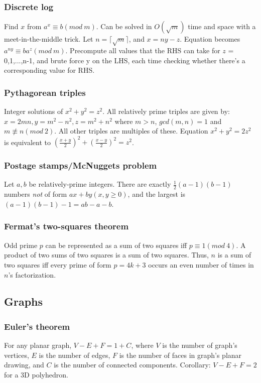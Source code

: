 \documentclass[a4paper,13pt]{article}
\begin{document}
\subsubsection{Discrete log}
Find $x$ from $a^x \equiv b (mod\ m)$. Can be solved in $O(\sqrt{m})$ time and space with a meet-in-the-middle trick. Let $n = \lceil \sqrt{m} \rceil$, and $x = ny - z$. Equation becomes $a^{ny} \equiv ba^z (mod\ m)$.
Precompute all values that the RHS can take for $z$ = 0,1,...,n-1, and brute force y on the LHS, each time checking whether there’s a corresponding value for RHS.

\subsubsection{Pythagorean triples}
Integer solutions of $x^2 + y^2 = z^2$. All relatively prime triples are given by: $x = 2mn, y = m^2 - n^2, z = m^2 + n^2$ where $m > n$, $gcd(m,n) = 1$ and $m \not\equiv n (mod\ 2)$. All other triples
are multiples of these. Equation $x^2 + y^2 = 2z^2$ is equivalent to $(\frac{x+y}{2})^2 + (\frac{x-y}{2})^2 = z^2$.

\subsubsection{Postage stamps/McNuggets problem}
Let $a, b$ be relatively-prime integers. There are exactly $\frac{1}{2}(a-1)(b-1)$ numbers \emph{not} of form $ax + by (x,y \geq 0)$, and the largest is $(a-1)(b-1)-1 = ab-a-b$.

\subsubsection{Fermat's two-squares theorem}
Odd prime $p$ can be represented as a sum of two squares iff $p \equiv 1 (mod\ 4)$. A product of two sums of two squares is a sum of two squares. Thus, $n$ is a sum of two squares iff every prime of form $p = 4k + 3$ occurs an even number of times in $n$'s factorization.

\subsection{Graphs}
\subsubsection{Euler’s theorem}
For any planar graph, $V - E + F = 1 + C$, where $V$ is the number of graph’s vertices, $E$ is the number of edges, $F$ is the number of faces in graph’s planar drawing,
and $C$ is the number of connected components. Corollary: $V - E + F = 2$ for a 3D polyhedron.
\end{document}
